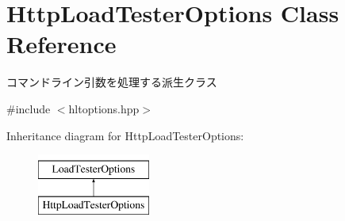 \hypertarget{class_http_load_tester_options}{}\section{Http\+Load\+Tester\+Options Class Reference}
\label{class_http_load_tester_options}


コマンドライン引数を処理する派生クラス  




{\ttfamily \#include $<$hltoptions.\+hpp$>$}

Inheritance diagram for Http\+Load\+Tester\+Options\+:\begin{figure}[H]
\begin{center}
\leavevmode
\includegraphics[height=2.000000cm]{class_http_load_tester_options}
\end{center}
\end{figure}
